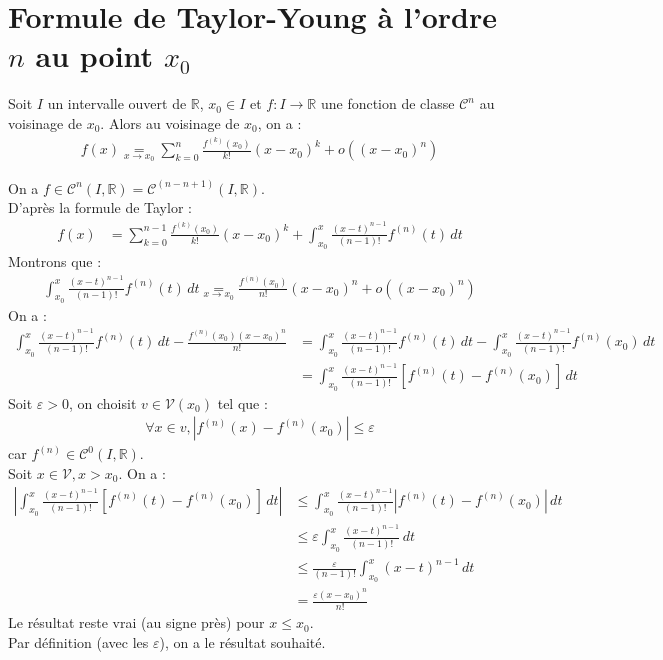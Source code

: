 \documentclass[../main.tex]{subfiles}
\begin{document}
\section{Formule de Taylor-Young à l'ordre $n$ au point $x_0$}
\begin{tcolorbox}[title=Théorème 25.27, title filled=false, colframe=orange, colback=orange!10!white]
    Soit $I$ un intervalle ouvert de $\mathbb{R}$, $x_0\in I$ et $f:I \to \mathbb{R}$ une fonction de classe $\mathcal{C}^n$ au voisinage de $x_0$. Alors au voisinage de $x_0$, on a : 
    \begin{align*}
        f(x) \underset{x\to x_0}{=} \sum_{k=0}^{n} \frac{f^{(k)}(x_0)}{k!} (x - x_0)^k + o((x-x_0)^n)
    \end{align*}
\end{tcolorbox}

\noindent On a $f \in \mathcal{C}^n(I, \mathbb{R}) = \mathcal{C}^{(n-n+1)}(I, \mathbb{R})$. \\
D'après la formule de Taylor : 
\begin{align*}
    f(x) &= \sum_{k=0}^{n-1} \frac{f^{(k)}(x_0)}{k!} (x - x_0)^k + \int_{x_0}^{x} \frac{(x-t)^{n-1}}{(n-1)!} f^{(n)}(t) \, dt
\end{align*}
Montrons que : 
\begin{align*}
    \int_{x_0}^{x} \frac{(x-t)^{n-1}}{(n-1)!} f^{(n)}(t) \, dt \underset{x\to x_0}{=} \frac{f^{(n)}(x_0)}{n!} (x-x_0)^n + o((x-x_0)^n)
\end{align*}
On a : 
\begin{align*}
    \int_{x_0}^{x} \frac{(x - t)^{n-1}}{(n-1)!} f^{(n)}(t) \, dt - \frac{f^{(n)}(x_0)(x - x_0)^n}{n!} &= \int_{x_0}^{x} \frac{(x - t)^{n-1}}{(n-1)!} f^{(n)}(t) \, dt - \int_{x_0}^{x} \frac{(x - t)^{n-1}}{(n-1)!} f^{(n)}(x_0) \, dt \\
    &= \int_{x_0}^{x} \frac{(x - t)^{n-1}}{(n-1)!} [f^{(n)}(t) - f^{(n)}(x_0)] \, dt
\end{align*}
Soit $\varepsilon > 0$, on choisit $v\in \mathcal{V}(x_0)$ tel que :
\begin{align*}
    \forall x \in v, |f^{(n)}(x) - f^{(n)}(x_0)| \leq \varepsilon
\end{align*}
car $f^{(n)} \in \mathcal{C}^0(I, \mathbb{R})$. \\
Soit $x\in \mathcal{V}, x > x_0$. On a : 
\begin{align*}
    \left| \int_{x_0}^{x} \frac{(x - t)^{n-1}}{(n-1)!} [f^{(n)}(t) - f^{(n)}(x_0)] \, dt \right| &\leq \int_{x_0}^{x} \frac{(x - t)^{n-1}}{(n-1)!} |f^{(n)}(t) - f^{(n)}(x_0)| \, dt \\
    &\leq \varepsilon \int_{x_0}^{x} \frac{(x - t)^{n-1}}{(n-1)!} \, dt \\
    &\leq \frac{\varepsilon}{(n-1)!} \int_{x_0}^{x} (x - t)^{n-1} \, dt \\
    &= \frac{\varepsilon(x-x_0)^n}{n!}
\end{align*}
Le résultat reste vrai (au signe près) pour $x \leq x_0$. \\
Par définition (avec les $\varepsilon$), on a le résultat souhaité. 
\end{document}
